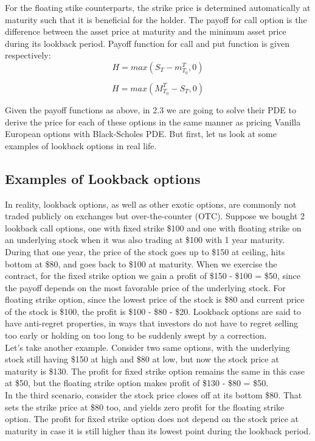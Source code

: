 \documentclass{article}
\begin{document}
For the floating stike counterparts, the strike price is determined automatically at maturity such that it is beneficial for the holder. The payoff for call option is the difference between the asset price at maturity and the minimum asset price during its lookback period. Payoff function for call and put function is given respectively:
\[
H=max(S_T - m_{T_0}^T, 0)
\]

\[
H=max(M_{T_0}^T - S_T, 0)
\]

Given the payoff functions as above, in 2.3 we are going to solve their PDE to derive the price for each of these options in the same manner as pricing Vanilla European options with Black-Scholes PDE.
But first, let us look at some examples of lookback options in real life.
\subsection{Examples of Lookback options
}

In reality, lookback options, as well as other exotic options, are commonly not traded publicly on exchanges but over-the-counter (OTC).
Suppose we bought 2 lookback call options, one with fixed strike \$100 and one with floating strike
on an underlying stock when it was also trading at \$100 with 1 year maturity.
During that one year, the price of the stock goes up to \$150 at ceiling, hits bottom at \$80, and goes back to \$100 at maturity.
When we exercise the contract, for the fixed strike option we gain a profit of \$150 - \$100 = \$50,
since the payoff depends on the most favorable price of the underlying stock.
For floating strike option, since the lowest price of the stock is \$80 and current price of the stock is \$100,
the profit is \$100 - \$80 - \$20.
Lookback options are said to have anti-regret properties, in ways that investors do not have to regret
selling too early or holding on too long to be suddenly swept by a correction. \\

Let's take another example. Consider two same options, with the underlying stock still having \$150 at high
and \$80 at low, but now the stock price at maturity is \$130. The profit for fixed strike option remains the
same in this case at \$50, but the floating strike option makes profit of \$130 - \$80 = \$50. \\

In the third scenario, consider the stock price closes off at its bottom \$80. That sets the strike price at \$80 too,
and yields zero profit for the floating strike option. The profit for fixed strike option does not depend on
the stock price at maturity in case it is still higher than its lowest point during the lookback period.
\end{document}
